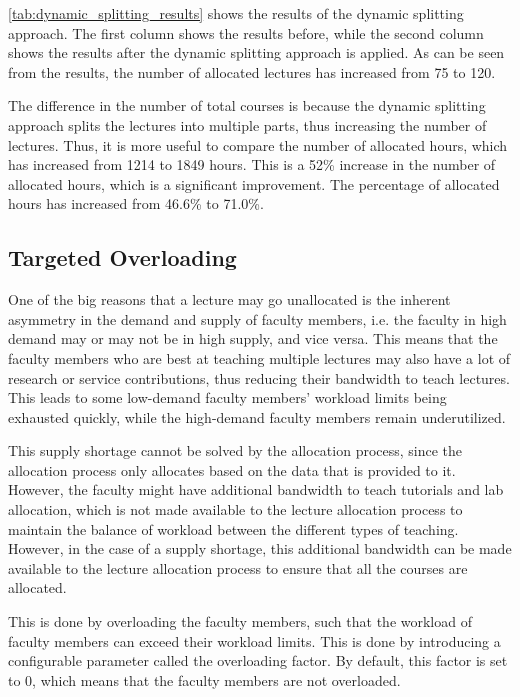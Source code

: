 \autoref{tab:dynamic_splitting_results} shows the results of the dynamic splitting approach. The first column shows the results before, while the second column shows the results after the dynamic splitting approach is applied. As can be seen from the results, the number of allocated lectures has increased from 75 to 120.

The difference in the number of total courses is because the dynamic splitting approach splits the lectures into multiple parts, thus increasing the number of lectures. Thus, it is more useful to compare the number of allocated hours, which has increased from 1214 to 1849 hours. This is a 52\% increase in the number of allocated hours, which is a significant improvement. The percentage of allocated hours has increased from 46.6\% to 71.0\%.


\subsection{Targeted Overloading}
\label{sec:targeted_overloading}

One of the big reasons that a lecture may go unallocated is the inherent asymmetry in the demand and supply of faculty members, i.e. the faculty in high demand may or may not be in high supply, and vice versa. This means that the faculty members who are best at teaching multiple lectures may also have a lot of research or service contributions, thus reducing their bandwidth to teach lectures. This leads to some low-demand faculty members' workload limits being exhausted quickly, while the high-demand faculty members remain underutilized.

This supply shortage cannot be solved by the allocation process, since the allocation process only allocates based on the data that is provided to it. However, the faculty might have additional bandwidth to teach tutorials and lab allocation, which is not made available to the lecture allocation process to maintain the balance of workload between the different types of teaching. However, in the case of a supply shortage, this additional bandwidth can be made available to the lecture allocation process to ensure that all the courses are allocated.

This is done by overloading the faculty members, such that the workload of faculty members can exceed their workload limits. This is done by introducing a configurable parameter called the overloading factor. By default, this factor is set to 0, which means that the faculty members are not overloaded.

